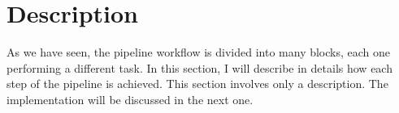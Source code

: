 
	
	\section{Description}
 
	As we have seen, the pipeline workflow is divided into many blocks, each one performing a different task. In this section, I will describe in details how each step of the pipeline is achieved. This section involves only a description. The implementation will be discussed in the next one.

	
	

